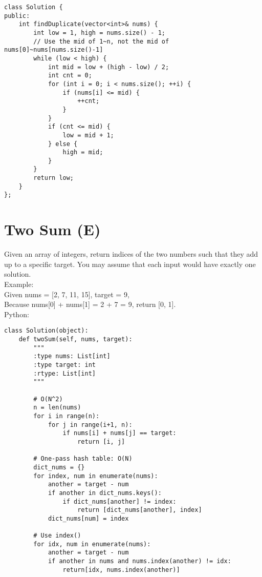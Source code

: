 \begin{lstlisting}
class Solution {
public:
    int findDuplicate(vector<int>& nums) {
        int low = 1, high = nums.size() - 1;
        // Use the mid of 1~n, not the mid of nums[0]~nums[nums.size()-1]
        while (low < high) {
            int mid = low + (high - low) / 2; 
            int cnt = 0;
            for (int i = 0; i < nums.size(); ++i) {
                if (nums[i] <= mid) {
                    ++cnt;
                }
            }
            if (cnt <= mid) {
                low = mid + 1;
            } else {
                high = mid;
            }
        }
        return low;
    }
};
\end{lstlisting}

\section{Two Sum (E)}
Given an array of integers, return indices of the two numbers such that they add up to a specific target. You may assume that each input would have exactly one solution. \\

Example:\\
Given nums = [2, 7, 11, 15], target = 9,\\
Because nums[0] + nums[1] = 2 + 7 = 9, return [0, 1].\\

Python:
\lstset{language=python}
\begin{lstlisting}
class Solution(object):
    def twoSum(self, nums, target):
        """
        :type nums: List[int]
        :type target: int
        :rtype: List[int]
        """
        
        # O(N^2)
        n = len(nums)
        for i in range(n):
            for j in range(i+1, n):
                if nums[i] + nums[j] == target:
                    return [i, j]
            
        # One-pass hash table: O(N)
        dict_nums = {}
        for index, num in enumerate(nums):
            another = target - num
            if another in dict_nums.keys():
                if dict_nums[another] != index:
                    return [dict_nums[another], index]
            dict_nums[num] = index
        
        # Use index()
        for idx, num in enumerate(nums):
            another = target - num
            if another in nums and nums.index(another) != idx:
                return[idx, nums.index(another)]
\end{lstlisting}

